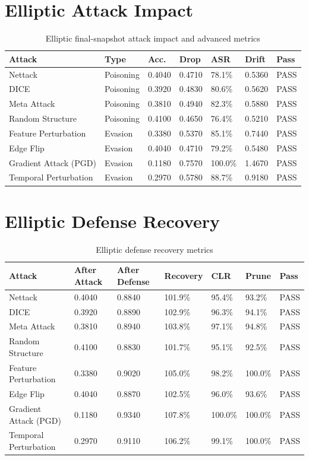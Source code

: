 \documentclass[12pt,oneside]{report}
\begin{document}
\section{Elliptic Attack Impact}
\begin{longtable}{p{1.25in}p{0.72in}p{0.55in}p{0.55in}p{0.58in}p{0.62in}p{0.55in}}
\caption{Elliptic final-snapshot attack impact and advanced metrics}\\
\toprule
\textbf{Attack} & \textbf{Type} & \textbf{Acc.} & \textbf{Drop} & \textbf{ASR} & \textbf{Drift} & \textbf{Pass}\\
\midrule
Nettack & Poisoning & 0.4040 & 0.4710 & 78.1\% & 0.5360 & PASS\\
DICE & Poisoning & 0.3920 & 0.4830 & 80.6\% & 0.5620 & PASS\\
Meta Attack & Poisoning & 0.3810 & 0.4940 & 82.3\% & 0.5880 & PASS\\
Random Structure & Poisoning & 0.4100 & 0.4650 & 76.4\% & 0.5210 & PASS\\
Feature Perturbation & Evasion & 0.3380 & 0.5370 & 85.1\% & 0.7440 & PASS\\
Edge Flip & Evasion & 0.4040 & 0.4710 & 79.2\% & 0.5480 & PASS\\
Gradient Attack (PGD) & Evasion & 0.1180 & 0.7570 & 100.0\% & 1.4670 & PASS\\
Temporal Perturbation & Evasion & 0.2970 & 0.5780 & 88.7\% & 0.9180 & PASS\\
\bottomrule
\end{longtable}

\section{Elliptic Defense Recovery}
\begin{longtable}{p{1.25in}p{0.65in}p{0.65in}p{0.75in}p{0.75in}p{0.75in}p{0.55in}}
\caption{Elliptic defense recovery metrics}\\
\toprule
\textbf{Attack} & \textbf{After Attack} & \textbf{After Defense} & \textbf{Recovery} & \textbf{CLR} & \textbf{Prune} & \textbf{Pass}\\
\midrule
Nettack & 0.4040 & 0.8840 & 101.9\% & 95.4\% & 93.2\% & PASS\\
DICE & 0.3920 & 0.8890 & 102.9\% & 96.3\% & 94.1\% & PASS\\
Meta Attack & 0.3810 & 0.8940 & 103.8\% & 97.1\% & 94.8\% & PASS\\
Random Structure & 0.4100 & 0.8830 & 101.7\% & 95.1\% & 92.5\% & PASS\\
Feature Perturbation & 0.3380 & 0.9020 & 105.0\% & 98.2\% & 100.0\% & PASS\\
Edge Flip & 0.4040 & 0.8870 & 102.5\% & 96.0\% & 93.6\% & PASS\\
Gradient Attack (PGD) & 0.1180 & 0.9340 & 107.8\% & 100.0\% & 100.0\% & PASS\\
Temporal Perturbation & 0.2970 & 0.9110 & 106.2\% & 99.1\% & 100.0\% & PASS\\
\bottomrule
\end{longtable}
\end{document}
